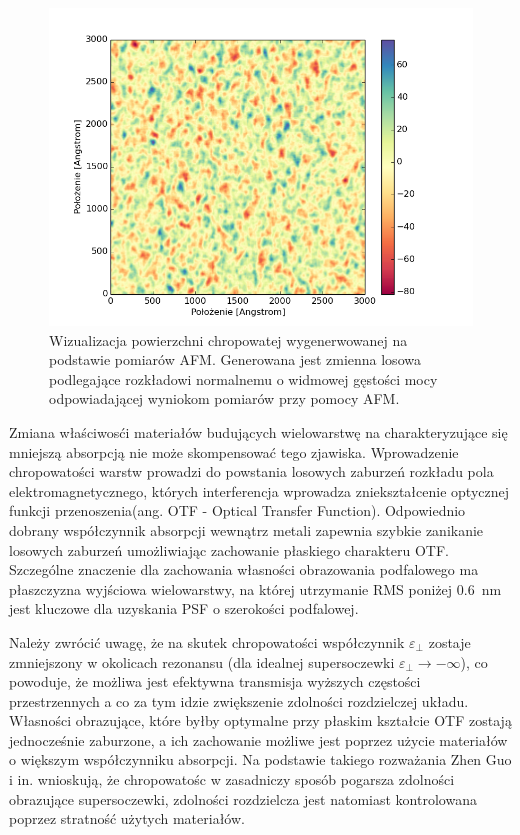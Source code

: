 \begin{figure}[bt]
		\includegraphics[width=\textwidth]{images/multilayer/ag30nm-afm-generated.png}
		\caption{Wizualizacja powierzchni chropowatej wygenerwowanej na podstawie pomiarów AFM. Generowana jest zmienna losowa podlegające rozkładowi normalnemu o widmowej gęstości mocy odpowiadającej wyniokom pomiarów przy pomocy AFM.} 
		\label{fig:ag30nm-afmgene}
\end{figure}


Zmiana właściwosći materiałów budujących wielowarstwę na charakteryzujące się mniejszą absorpcją nie może skompensować tego zjawiska. Wprowadzenie chropowatości warstw prowadzi do powstania losowych zaburzeń rozkładu pola elektromagnetycznego, których interferencja wprowadza zniekształcenie optycznej funkcji przenoszenia(ang. OTF - Optical Transfer Function). Odpowiednio dobrany współczynnik absorpcji wewnątrz metali zapewnia szybkie zanikanie losowych zaburzeń umożliwiając zachowanie płaskiego charakteru OTF. Szczególne znaczenie dla zachowania własności obrazowania podfalowego ma płaszczyzna wyjściowa wielowarstwy, na której utrzymanie RMS poniżej $0.6$~nm jest kluczowe dla uzyskania PSF o szerokości podfalowej. \cite{guo2014negative}

Należy zwrócić uwagę, że na skutek chropowatości współczynnik $\varepsilon_{\perp}$ zostaje zmniejszony w okolicach rezonansu (dla idealnej supersoczewki $\varepsilon_{\perp} \to - \infty$), co powoduje, że możliwa jest efektywna transmisja wyższych częstości przestrzennych a co za tym idzie zwiększenie zdolności rozdzielczej układu. Własności obrazujące, które byłby optymalne przy płaskim kształcie OTF zostają jednocześnie zaburzone, a ich zachowanie możliwe jest poprzez użycie materiałów o większym współczynniku absorpcji. Na podstawie takiego rozważania Zhen Guo i in. wnioskują, że chropowatośc w zasadniczy sposób pogarsza zdolności obrazujące supersoczewki, zdolności rozdzielcza jest natomiast kontrolowana poprzez stratność użytych materiałów.

